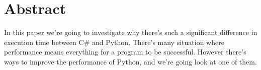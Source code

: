 \section*{Abstract}

In this paper we're going to investigate why there's such a significant difference in execution time between C\# and Python. There's many situation where performance means everything for a program to be successful. However there's ways to improve the performance of Python, and we're going look at one of them.  
